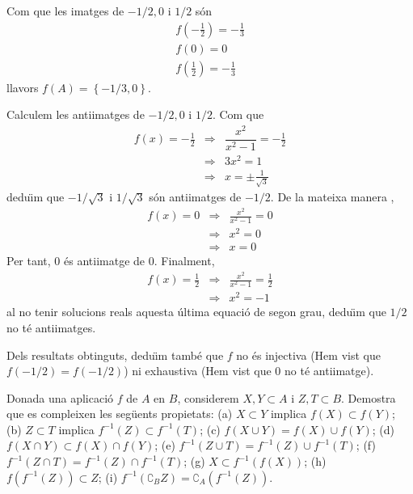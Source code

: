 \begin{solucio}
Com que les imatges de $-1/2,0$ i $1/2$ s\'{o}n%
\begin{equation*}
\begin{array}{l}
f(-\frac{1}{2})=-\frac{1}{3} \\
f(0)=0 \\
f(\frac{1}{2})=-\frac{1}{3}%
\end{array}%
\end{equation*}%
llavors $f(A)=\left\{ -1/3,0\right\} $.

Calculem les antiimatges de $-1/2,0$ i $1/2$. Com que%
\begin{equation*}
\begin{array}{lll}
f(x)=-\frac{1}{2} & \Longrightarrow & \dfrac{x^{2}}{x^{2}-1}=-\frac{1}{2} \\
& \Longrightarrow & 3x^{2}=1 \\
& \Longrightarrow & x=\pm \frac{1}{\sqrt{3}}%
\end{array}%
\end{equation*}%
dedu\"{\i}m que $-1/\sqrt{3}$ i $1/\sqrt{3}$ s\'{o}n antiimatges de $-1/2$.
De la mateixa manera ,%
\begin{equation*}
\begin{array}{lll}
f(x)=0 & \Longrightarrow & \frac{x^{2}}{x^{2}-1}=0 \\
& \Longrightarrow & x^{2}=0 \\
& \Longrightarrow & x=0%
\end{array}%
\end{equation*}%
Per tant, $0$ \'{e}s antiimatge de $0$. Finalment,%
\begin{equation*}
\begin{array}{lll}
f(x)=\frac{1}{2} & \Longrightarrow & \frac{x^{2}}{x^{2}-1}=\frac{1}{2} \\
& \Longrightarrow & x^{2}=-1%
\end{array}%
\end{equation*}%
al no tenir solucions reals aquesta \'{u}ltima equaci\'{o} de segon grau,
dedu\"{\i}m que $1/2$ no t\'{e} antiimatges.

Dels resultats obtinguts, dedu\"{\i}m tamb\'{e} que $f$ no \'{e}s injectiva
(Hem vist que $f(-1/2)=f(-1/2)$) ni exhaustiva (Hem vist que $0$ no t\'{e}
antiimatge).
\end{solucio}

\begin{exer}
Donada una aplicaci\'{o} $f$ de $A$ en $B$, considerem $X,Y\subset A$ i $%
Z,T\subset B$. Demostra que es compleixen les seg\"{u}ents propietats: (a) $%
X\subset Y$ implica $f(X)\subset f(Y)$; (b) $Z\subset T$ implica $%
f^{-1}(Z)\subset f^{-1}(T)$; (c) $f(X\cup Y)=f(X)\cup f(Y)$; (d) $f(X\cap
Y)\subset f(X)\cap f(Y)$; (e) $f^{-1}(Z\cup T)=f^{-1}(Z)\cup f^{-1}(T)$; (f)
$f^{-1}(Z\cap T)=f^{-1}(Z)\cap f^{-1}(T)$; (g) $X\subset f^{-1}\left(
f(X)\right) $; (h) $f\left( f^{-1}(Z)\right) \subset Z$; (i) $f^{-1}\left(
\complement _{B}Z\right) =\complement _{A}\left( f^{-1}(Z)\right) $.
\end{exer}

